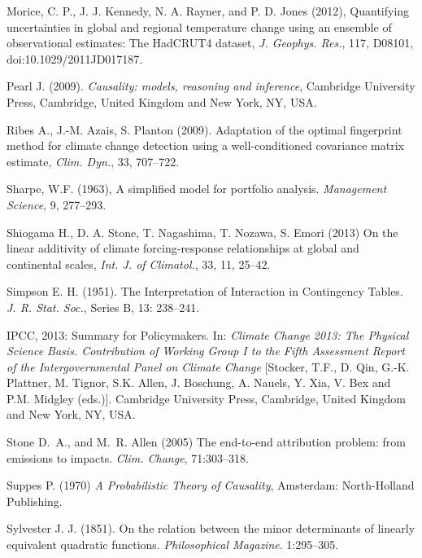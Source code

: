 \documentclass[12pt]{article}
\begin{document}
\begin{thebibliography}{00}
Morice, C. P., J. J. Kennedy, N. A. Rayner, and P. D. Jones (2012), Quantifying uncertainties in global and regional temperature change using an ensemble of observational estimates: The HadCRUT4 dataset, {\em J. Geophys. Res.}, 117, D08101, doi:10.1029/2011JD017187.

Pearl J. (2009). {\em Causality: models, reasoning and inference}, Cambridge University Press, Cambridge, United Kingdom and New York, NY, USA.

Ribes A., J.-M. Azais, S. Planton (2009). Adaptation of the optimal fingerprint method for climate change detection using a well-conditioned covariance matrix estimate, {\em Clim. Dyn.}, 33, 707--722.

Sharpe, W.F. (1963),  A simplified model for portfolio analysis. {\em Management Science}, 9, 277--293.

Shiogama H., D. A. Stone, T. Nagashima, T. Nozawa, S. Emori (2013) On the linear additivity of climate forcing-response relationships at global and continental scales, {\em Int. J. of Climatol.}, 33, 11, 25--42.

Simpson E. H. (1951). The Interpretation of Interaction in Contingency Tables. {\em J. R. Stat. Soc.}, Series B, 13: 238--241.
 
IPCC, 2013: Summary for Policymakers. In: {\em Climate Change 2013: The Physical Science Basis. Contribution of Working Group I to the Fifth Assessment Report of the Intergovernmental Panel on Climate Change} [Stocker, T.F., D. Qin, G.-K. Plattner, M. Tignor, S.K. Allen, J. Boschung, A. Nauels, Y. Xia, V. Bex and P.M. Midgley (eds.)]. Cambridge University Press, Cambridge, United Kingdom and New York, NY, USA.

Stone D.~A., and M.~R. Allen (2005) The end-to-end attribution problem: from emissions to impacts. {\em Clim. Change}, 71:303--318.

Suppes P. (1970) {\em A Probabilistic Theory of Causality}, Amsterdam: North-Holland Publishing.

Sylvester J. J. (1851). On the relation between the minor determinants of linearly equivalent quadratic functions. {\em Philosophical Magazine}. 1:295--305.


\end{thebibliography}
\end{document}
